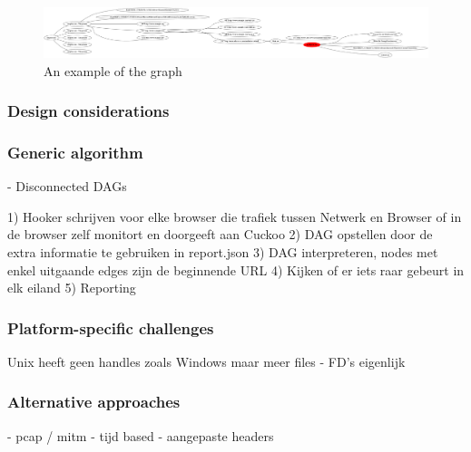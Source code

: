 \begin{figure}[h]
    \centering
    \includegraphics[width=17cm]{Images/alg_tree.png}
    \caption{An example of the graph}
    \label{fig:alg_tree}
\end{figure}

\subsubsection{Design considerations}

\subsubsection{Generic algorithm}

- Disconnected DAGs

1) Hooker schrijven voor elke browser die trafiek tussen Netwerk en Browser of in de browser zelf monitort en doorgeeft aan Cuckoo
2) DAG opstellen door de extra informatie te gebruiken in report.json
3) DAG interpreteren, nodes met enkel uitgaande edges zijn de beginnende URL
4) Kijken of er iets raar gebeurt in elk eiland
5) Reporting

\subsubsection{Platform-specific challenges}

Unix heeft geen handles zoals Windows maar meer files
	- FD's eigenlijk

\subsubsection{Alternative approaches}

- pcap / mitm
- tijd based
- aangepaste headers